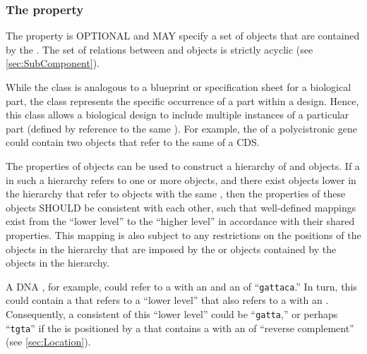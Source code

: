\subsubsection*{The  property}
\label{sec:components}

The  property is OPTIONAL and MAY specify a set of  objects that are contained by the . The set of relations between  and  objects is strictly acyclic (see \ref{sec:SubComponent}).

While the  class is analogous to a blueprint or specification sheet for a biological part, the  class represents the specific occurrence of a part within a design.
Hence, this class allows a biological design to include multiple instances of a particular part (defined by reference to the same ). For example, the  of a polycistronic gene could contain two  objects that refer to the same  of a CDS.

The  properties of  objects can be used to construct a hierarchy of  and  objects. 
If a  in such a hierarchy refers to one or more  objects, and there exist  objects lower in the hierarchy that refer to  objects with the same , then the  properties of these  objects SHOULD be consistent with each other, such that well-defined mappings exist from the ``lower level''  to the ``higher level''  in accordance with their shared  properties. 
This mapping is also subject to any restrictions on the positions of the  objects in the hierarchy that are imposed by the  or  objects contained by the  objects in the hierarchy.

A DNA , for example, could refer to a  with an   and an   of ``{\tt gattaca}.'' In turn, this  could contain a  that refers to a ``lower level''   that also refers to a  with an  . Consequently, a consistent   of this ``lower level''  could be ``{\tt gatta},'' or perhaps ``{\tt tgta}'' if the  is positioned by a  that contains a   with an  of ``reverse complement'' (see \ref{sec:Location}).

